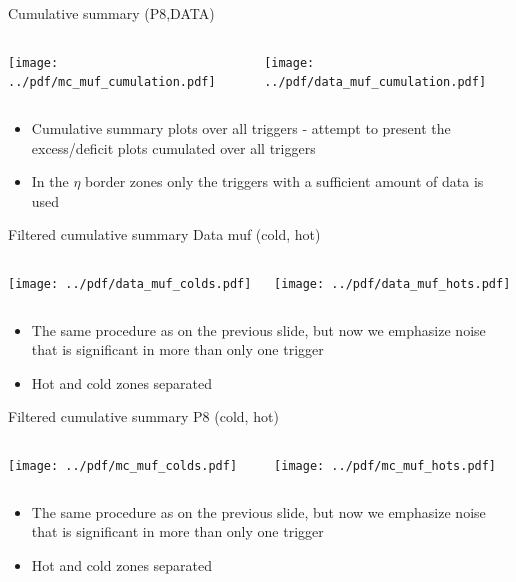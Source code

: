 \documentclass[9pt]{beamer}
\begin{document}
\begin{frame}[t]{Cumulative summary (P8,DATA)}
\begin{columns}[T]
  \begin{column}{.5\textwidth}
  \texttt{[image: ../pdf/mc\_muf\_cumulation.pdf]}
  \end{column}
  \begin{column}{.5\textwidth}
  \texttt{[image: ../pdf/data\_muf\_cumulation.pdf]}
  \end{column}
\end{columns}
\begin{itemize}
 \item Cumulative summary plots over all triggers - attempt to present the excess/deficit plots cumulated over all triggers
 \item In the $\eta$ border zones only the triggers with a sufficient amount of data is used
\end{itemize}
\end{frame}

\begin{frame}[t]{Filtered cumulative summary Data muf (cold, hot)}
\begin{columns}[T]
  \begin{column}{.5\textwidth}
  \texttt{[image: ../pdf/data\_muf\_colds.pdf]}
  \end{column}
  \begin{column}{.5\textwidth}
  \texttt{[image: ../pdf/data\_muf\_hots.pdf]}
  \end{column}
\end{columns}
\begin{itemize}
 \item The same procedure as on the previous slide, but now we emphasize noise that is significant in more than only one trigger
 \item Hot and cold zones separated
\end{itemize}
\end{frame}

\begin{frame}[t]{Filtered cumulative summary P8 (cold, hot)}
\begin{columns}[T]
  \begin{column}{.5\textwidth}
  \texttt{[image: ../pdf/mc\_muf\_colds.pdf]}
  \end{column}
  \begin{column}{.5\textwidth}
  \texttt{[image: ../pdf/mc\_muf\_hots.pdf]}
  \end{column}
\end{columns}
\begin{itemize}
 \item The same procedure as on the previous slide, but now we emphasize noise that is significant in more than only one trigger
 \item Hot and cold zones separated
\end{itemize}
\end{frame}
\end{document}
